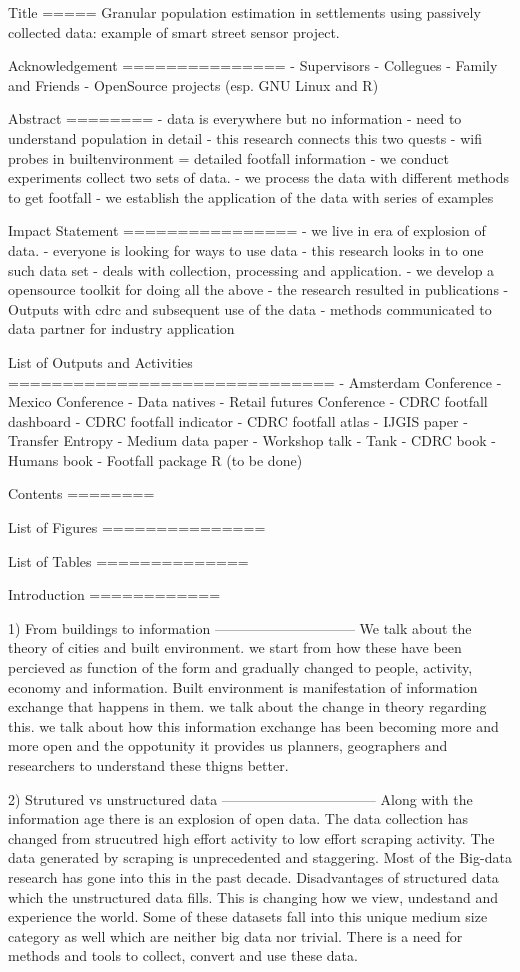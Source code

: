 Title
=====
Granular population estimation in settlements using passively collected data:
example of smart street sensor project.

Acknowledgement
===============
- Supervisors
- Collegues
- Family and Friends
- OpenSource projects
  (esp. GNU Linux and R)

Abstract
========
 - data is everywhere but no information
 - need to understand population in detail
 - this research connects this two quests
 - wifi probes in builtenvironment = detailed footfall information
 - we conduct experiments collect two sets of data.
 - we process the data with different methods to get footfall
 - we establish the application of the data with series of examples

Impact Statement
================
 - we live in era of explosion of data.
 - everyone is looking for ways to use data
 - this research looks in to one such data set
 - deals with collection, processing and application.
 - we develop a opensource toolkit for doing all the above
 - the research resulted in publications
 - Outputs with cdrc and subsequent use of the data 
 - methods communicated to data partner for industry application

List of Outputs and Activities
==============================
 - Amsterdam Conference
 - Mexico Conference
 - Data natives
 - Retail futures Conference 
 - CDRC footfall dashboard
 - CDRC footfall indicator
 - CDRC footfall atlas
 - IJGIS paper
 - Transfer Entropy
 - Medium data paper
 - Workshop talk - Tank
 - CDRC book
 - Humans book
 - Footfall package R (to be done)

Contents
========

List of Figures
===============

List of Tables
==============

Introduction
============

1) From buildings to information
------------------------------
We talk about the theory of cities and built environment.
we start from how these have been percieved as function of the
form and gradually changed to people, activity, economy and information.
Built environment is manifestation of information exchange that happens
in them. we talk about the change in theory regarding this. we talk about
how this information exchange has been becoming more and more open and
the oppotunity it provides us planners, geographers and researchers
to understand these thigns better.

2) Strutured vs unstructured data
---------------------------------
Along with the information age there is an explosion of open data.
The data collection has changed from strucutred high effort activity
to low effort scraping activity. The data generated by scraping is
unprecedented and staggering. Most of the Big-data research has gone into
this in the past decade. Disadvantages of structured data which the
unstructured data fills. This is changing how we view, undestand and experience
the world. Some of these datasets fall into this unique medium size category 
as well which are neither big data nor trivial. There is
a need for methods and tools to collect, convert and use these data.

